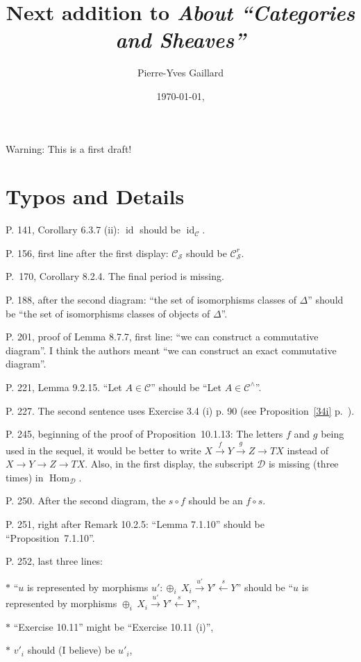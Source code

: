 \documentclass[12pt]{article}
\title{Next addition to \em{About ``Categories and Sheaves''}}
\author{Pierre-Yves Gaillard}
\date{\today, \currenttime}
\theoremstyle{remark}
\newcommand{\n}{\noindent}
\newcommand{\cc}{\mathcal}
\newcommand{\C}{\mathcal C}
\newcommand{\xr}{\xrightarrow}
\newcommand{\pr}{Proposition}
\DeclareMathOperator{\id}{id}
\DeclareMathOperator{\h}{Hom}
\begin{document}
 
% 
\maketitle 

\n Warning: This is a first draft!
%
\section{Typos and Details} 
%
\n P. 141, Corollary 6.3.7 (ii): $\id$ should be $\id_\C$. 

\n P. 156, first line after the first display: $\C_{\cc S}$ should be $\C_{\cc S}^r$. 

\n P.~170, Corollary 8.2.4. The final period is missing. 

\n P. 188, after the second diagram: ``the set of isomorphisms classes of $\Delta$'' should be ``the set of isomorphisms classes of objects of $\Delta$''. 


\n P. 201, proof of Lemma 8.7.7, first line: ``we can construct a commutative diagram''. I think the authors meant ``we can construct an exact commutative diagram''. 

\n P. 221, Lemma 9.2.15. ``Let $A\in\C$'' should be ``Let $A\in\C^\wedge$''. 

\n P. 227. The second sentence uses Exercise 3.4 (i) p. 90 (see Proposition~\ref{34i} p.~\pageref{34i}). 

\n P. 245, beginning of the proof of \pr\ 10.1.13: The letters $f$ and $g$ being used in the sequel, it would be better to write $X\xr fY\xr gZ\to TX$ instead of $X\to Y\to Z\to TX$. Also, in the first display, the subscript $\cc D$ is missing (three times) in $\h_{\cc D}$. 

\n P. 250. After the second diagram, the $s\circ f$ should be an $f\circ s$. 

\n P. 251, right after Remark 10.2.5: ``Lemma 7.1.10'' should be ``\pr\ 7.1.10''.

\n P. 252, last three lines: 

$*$ ``$u$ is represented by morphisms $u':\oplus_i\ X_i\xr{u'}Y'\xleftarrow sY$'' should be ``$u$ is represented by morphisms $\oplus_i\ X_i\xr{u'}Y'\xleftarrow sY$'', 

$*$ ``Exercise 10.11'' might be ``Exercise 10.11 (i)'',

$*$ $v'_i$ should (I believe) be $u'_i$, 
\end{document}
